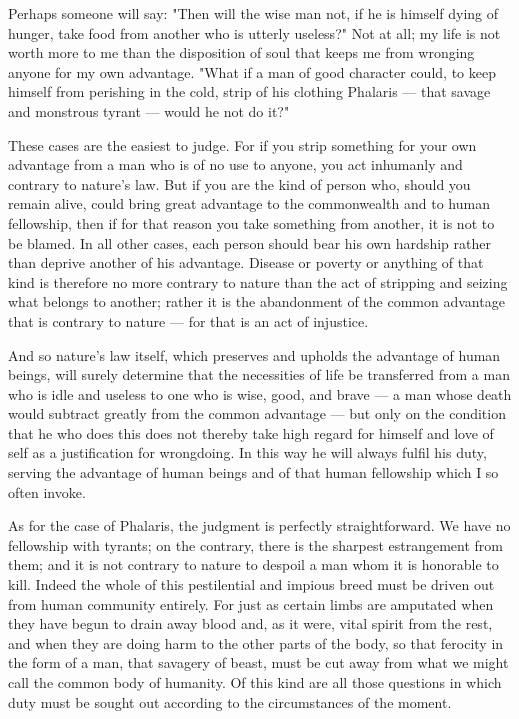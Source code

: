  Perhaps someone will say: "Then will the wise man not, if he is himself dying of hunger, take food from another who is utterly useless?" Not at all; my life is not worth more to me than the disposition of soul that keeps me from wronging anyone for my own advantage. "What if a man of good character could, to keep himself from perishing in the cold, strip of his clothing Phalaris — that savage and monstrous tyrant — would he not do it?"

 These cases are the easiest to judge. For if you strip something for your own advantage from a man who is of no use to anyone, you act inhumanly and contrary to nature's law. But if you are the kind of person who, should you remain alive, could bring great advantage to the commonwealth and to human fellowship, then if for that reason you take something from another, it is not to be blamed. In all other cases, each person should bear his own hardship rather than deprive another of his advantage. Disease or poverty or anything of that kind is therefore no more contrary to nature than the act of stripping and seizing what belongs to another; rather it is the abandonment of the common advantage that is contrary to nature — for that is an act of injustice.

 And so nature's law itself, which preserves and upholds the advantage of human beings, will surely determine that the necessities of life be transferred from a man who is idle and useless to one who is wise, good, and brave — a man whose death would subtract greatly from the common advantage — but only on the condition that he who does this does not thereby take high regard for himself and love of self as a justification for wrongdoing. In this way he will always fulfil his duty, serving the advantage of human beings and of that human fellowship which I so often invoke.

 As for the case of Phalaris, the judgment is perfectly straightforward. We have no fellowship with tyrants; on the contrary, there is the sharpest estrangement from them; and it is not contrary to nature to despoil a man whom it is honorable to kill. Indeed the whole of this pestilential and impious breed must be driven out from human community entirely. For just as certain limbs are amputated when they have begun to drain away blood and, as it were, vital spirit from the rest, and when they are doing harm to the other parts of the body, so that ferocity in the form of a man, that savagery of beast, must be cut away from what we might call the common body of humanity. Of this kind are all those questions in which duty must be sought out according to the circumstances of the moment.

